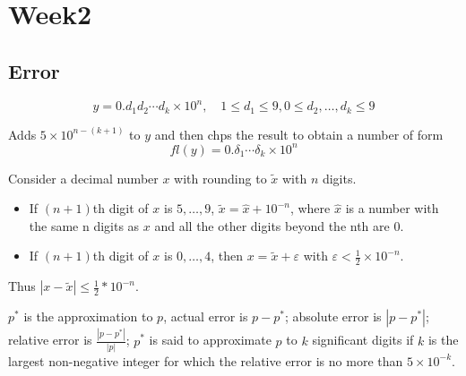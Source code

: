 
\chapter{Week2}
\section{Error}
\begin{definition}
\[
y=0.d_1d_2\cdots d_k\times 10^n,\quad 1\le d_1\le 9, 0\le d_2,\dots,d_k\le 9
\]
\end{definition}
\begin{definition}[Rounding]
Adds $5\times10^{n-(k+1)}$ to $y$ and then chps the result to obtain a number of form
\[
fl(y)=0.\delta_1\cdots\delta_k\times 10^n
\]
\end{definition}
Consider a decimal number $x$ with rounding to $\tilde x$ with $n$ digits.
\begin{itemize}
\item
If $(n+1)$th digit of $x$ is $5,\dots,9$, $\tilde x=\hat x+10^{-n}$, where $\hat x$ is a number with the same n digits as $x$ and all the other digits beyond the nth are 0.
\item
If $(n+1)$th digit of $x$ is $0,\dots,4$, then $x=\tilde x+\varepsilon$ with $\varepsilon<\frac{1}{2}\times10^{-n}.$
\end{itemize}
Thus $|x-\tilde x|\le\frac{1}{2}*10^{-n}$.
\begin{definition}[erros]
$p^*$ is the approximation to $p$, actual error is $p-p^*$; absolute error is $|p-p^*|$; relative error is $\frac{|p-p^*|}{|p|}$; $p^*$ is said to approximate $p$ to $k$ significant digits if $k$ is the largest non-negative integer for which the relative error is no more than $5\times 10^{-k}$.
\end{definition}

